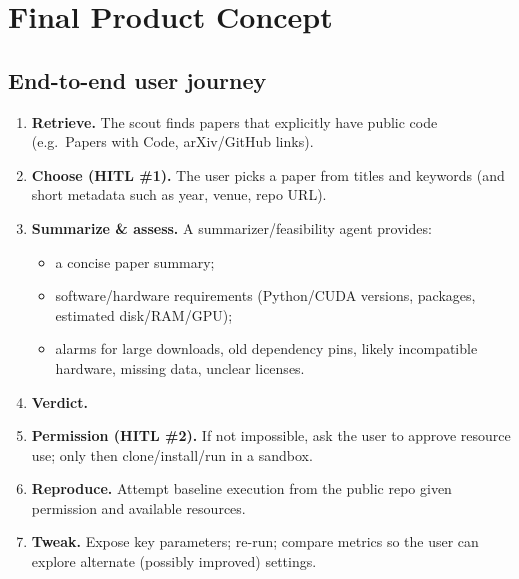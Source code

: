 \documentclass[11pt,a4paper]{article}
\begin{document}
\section{Final Product Concept}
\label{sec:concept}

\subsection{End-to-end user journey}
\begin{enumerate}[leftmargin=*]
  \item \textbf{Retrieve.} The scout finds papers that explicitly have
        public code (e.g.\ Papers with Code, arXiv/GitHub links).
  \item \textbf{Choose (HITL \#1).} The user picks a paper from titles and
        keywords (and short metadata such as year, venue, repo URL).
  \item \textbf{Summarize \& assess.} A summarizer/feasibility agent
        provides:
        \begin{itemize}
          \item a concise paper summary;
          \item software/hardware requirements (Python/CUDA versions,
                packages, estimated disk/RAM/GPU);
          \item alarms for large downloads, old dependency pins, likely
                incompatible hardware, missing data, unclear licenses.
        \end{itemize}
  \item \textbf{Verdict.}
  \item \textbf{Permission (HITL \#2).} If not impossible, ask the user to
        approve resource use; only then clone/install/run in a sandbox.
  \item \textbf{Reproduce.} Attempt baseline execution from the public repo
        given permission and available resources.
  \item \textbf{Tweak.} Expose key parameters; re-run; compare metrics so the
        user can explore alternate (possibly improved) settings.
\end{enumerate}
\end{document}
